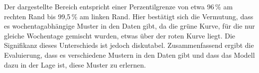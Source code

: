 Der dargestellte Bereich entspricht einer Perzentilgrenze von etwa 96\,\% am rechten Rand bis 99,5\,\% am linken Rand.
Hier bestätigt sich die Vermutung, dass es wochentagabhängige Muster in den Daten gibt, da die grüne Kurve, für die nur gleiche Wochentage gemischt wurden, etwas über der roten Kurve liegt.
Die Signifikanz dieses Unterschieds ist jedoch diskutabel.
Zusammenfassend ergibt die Evaluierung, dass es verschiedene Mustern in den Daten gibt und dass das Modell dazu in der Lage ist, diese Muster zu erlernen.
